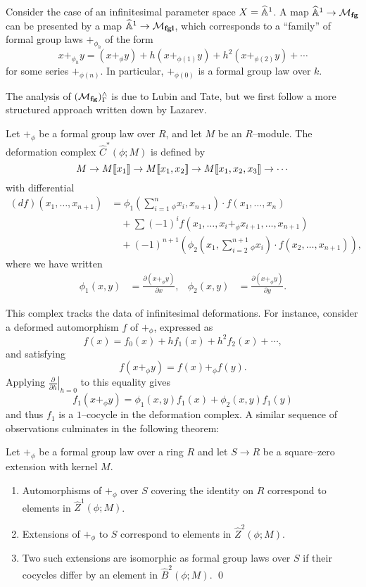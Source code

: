\begin{example}
Consider the case of an infinitesimal parameter space $X = \widehat{\mathbb{A}}^1$.  A map $\widehat{\mathbb{A}}^1 \to \mathcal{M}_{\mathbf{fg}}$ can be presented by a map $\widehat{\mathbb{A}}^1 \to \mathcal{M}_{\mathbf{fgl}}$, which corresponds to a ``family'' of formal group laws $+_{\phi_h}$ of the form \[x +_{\phi_h} y = (x +_\phi y) + h(x +_{\phi(1)} y) + h^2(x +_{\phi(2)} y) + \cdots\] for some series $+_{\phi(n)}$.  In particular, $+_{\phi(0)}$ is a formal group law over $k$.
\end{example}

The analysis of $(\mathcal{M}_{\mathbf{fg}})^\wedge_\Gamma$ is due to Lubin and Tate, but we first follow a more structured approach written down by Lazarev.
\begin{definition}
Let $+_\phi$ be a formal group law over $R$, and let $M$ be an $R$--module. The deformation complex $\widehat C^*(\phi; M)$ is defined by \[M \to M\llbracket{x_1}\rrbracket \to M\llbracket{x_1, x_2}\rrbracket \to M\llbracket{x_1, x_2, x_3}\rrbracket \to \cdots\] with differential
\begin{align*}
(df)(x_1, \ldots, x_{n+1}) & = \phi_1\left(\sum_{i=1}^n {}_\phi x_i, x_{n+1} \right) \cdot f(x_1, \ldots, x_n) \\
& \quad + \sum (-1)^i f(x_1, \ldots, x_i +_\phi x_{i+1}, \ldots, x_{n+1}) \\
& \quad + (-1)^{n+1} \left( \phi_2\left(x_1, \sum_{i=2}^{n+1} {}_\phi x_i \right) \cdot f(x_2, \ldots, x_{n+1}) \right),
\end{align*}
where we have written
\begin{align*}
\phi_1(x, y) & = \frac{\partial(x +_\phi y)}{\partial x}, &
\phi_2(x, y) & = \frac{\partial(x +_\phi y)}{\partial y}.
\end{align*}
\end{definition}

This complex tracks the data of infinitesimal deformations.  For instance, consider a deformed automorphism $f$ of $+_\phi$, expressed as \[f(x) = f_0(x) + h f_1(x) + h^2 f_2(x) + \cdots,\] and satisfying \[f(x +_\phi y) = f(x) +_\phi f(y).\]  Applying $\left.\frac{\partial}{\partial h}\right|_{h=0}$ to this equality gives \[f_1(x +_\phi y) = \phi_1(x, y)f_1(x) + \phi_2(x, y)f_1(y)\] and thus $f_1$ is a $1$--cocycle in the deformation complex.  A similar sequence of observations culminates in the following theorem:
\begin{theorem}
Let $+_\phi$ be a formal group law over a ring $R$ and let $S \to R$ be a square--zero extension with kernel $M$.
\begin{enumerate}
\item Automorphisms of $+_\phi$ over $S$ covering the identity on $R$ correspond to elements in $\widehat Z^1(\phi; M)$.
\item Extensions of $+_\phi$ to $S$ correspond to elements in $\widehat Z^2(\phi; M)$.
\item Two such extensions are isomorphic as formal group laws over $S$ if their cocycles differ by an element in $\widehat B^2(\phi; M)$. \qed
\end{enumerate}
\end{theorem}

